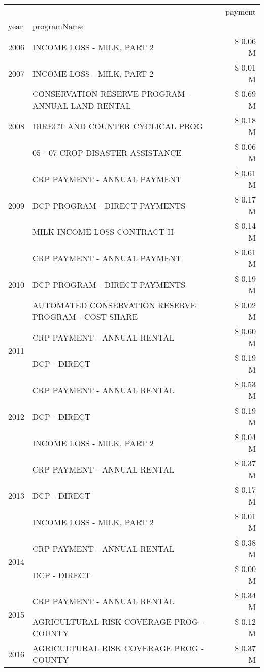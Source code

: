 \begin{tabular}{llr}
\toprule
 &  & payment \\
year & programName &  \\
\midrule
2006 & INCOME LOSS - MILK, PART 2 & \$ 0.06 M \\
\cline{1-3}
2007 & INCOME LOSS - MILK, PART 2 & \$ 0.01 M \\
\cline{1-3}
\multirow[t]{3}{*}{2008} & CONSERVATION RESERVE PROGRAM - ANNUAL LAND RENTAL & \$ 0.69 M \\
 & DIRECT AND COUNTER CYCLICAL PROG & \$ 0.18 M \\
 & 05 - 07 CROP DISASTER ASSISTANCE & \$ 0.06 M \\
\cline{1-3}
\multirow[t]{3}{*}{2009} & CRP PAYMENT - ANNUAL PAYMENT & \$ 0.61 M \\
 & DCP PROGRAM - DIRECT PAYMENTS & \$ 0.17 M \\
 & MILK INCOME LOSS CONTRACT II & \$ 0.14 M \\
\cline{1-3}
\multirow[t]{3}{*}{2010} & CRP PAYMENT - ANNUAL PAYMENT & \$ 0.61 M \\
 & DCP PROGRAM - DIRECT PAYMENTS & \$ 0.19 M \\
 & AUTOMATED CONSERVATION RESERVE PROGRAM - COST SHARE & \$ 0.02 M \\
\cline{1-3}
\multirow[t]{2}{*}{2011} & CRP PAYMENT - ANNUAL RENTAL & \$ 0.60 M \\
 & DCP - DIRECT & \$ 0.19 M \\
\cline{1-3}
\multirow[t]{3}{*}{2012} & CRP PAYMENT - ANNUAL RENTAL & \$ 0.53 M \\
 & DCP - DIRECT & \$ 0.19 M \\
 & INCOME LOSS - MILK, PART 2 & \$ 0.04 M \\
\cline{1-3}
\multirow[t]{3}{*}{2013} & CRP PAYMENT - ANNUAL RENTAL & \$ 0.37 M \\
 & DCP - DIRECT & \$ 0.17 M \\
 & INCOME LOSS - MILK, PART 2 & \$ 0.01 M \\
\cline{1-3}
\multirow[t]{2}{*}{2014} & CRP PAYMENT - ANNUAL RENTAL & \$ 0.38 M \\
 & DCP - DIRECT & \$ 0.00 M \\
\cline{1-3}
\multirow[t]{2}{*}{2015} & CRP PAYMENT - ANNUAL RENTAL & \$ 0.34 M \\
 & AGRICULTURAL RISK COVERAGE PROG - COUNTY & \$ 0.12 M \\
\cline{1-3}
\multirow[t]{3}{*}{2016} & AGRICULTURAL RISK COVERAGE PROG - COUNTY & \$ 0.37 M \\

\end{tabular}
